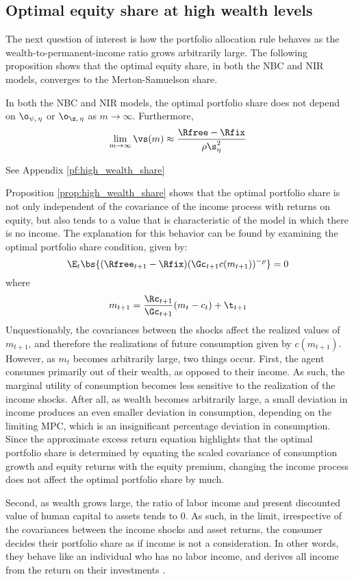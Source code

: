 \subsection{Optimal equity share at high wealth levels}

The next question of interest is how the portfolio allocation rule behaves as the wealth-to-permanent-income ratio grows arbitrarily large. The following proposition shows that the optimal equity share, in both the NBC and NIR models, converges to the Merton-Samuelson share.

\begin{prop}\label{prop:high_wealth_share}
    In both the NBC and NIR models, the optimal portfolio share does not depend on $\o_{\psi,\,\eta}$ or $\o_{\z,\,\eta}$ as $m \to \infty$. Furthermore,
    \[
        \lim_{m\to\infty}\vs(m) \approx \frac{\Rfree - \Rfix}{\rho\s_{\eta}^2}
    \]
\end{prop}

\pf See Appendix \ref{pf:high_wealth_share}

Proposition \ref{prop:high_wealth_share} shows that the optimal portfolio share is not only independent of the covariance of the income process with returns on equity, but also tends to a value that is characteristic of the model in which there is no income. The explanation for this behavior can be found by examining the optimal portfolio share condition, given by:
\[
\E_{t}\bs{(\Rfree_{t+1} - \Rfix)(\Gc_{t+1}c(m_{t+1}))^{-\rho}} = 0
\]
where
\[
m_{t+1} = \frac{\Rc_{t+1}}{\Gc_{t+1}}(m_{t} - c_{t}) + \t_{t+1}
\]
Unquestionably, the covariances between the shocks affect the realized values of $m_{t+1}$, and therefore the realizations of future consumption given by $c(m_{t+1})$. However, as $m_{t}$ becomes arbitrarily large, two things occur. First, the agent consumes primarily out of their wealth, as opposed to their income. As such, the marginal utility of consumption becomes less sensitive to the realization of the income shocks. After all, as wealth becomes arbitrarily large, a small deviation in income produces an even smaller deviation in consumption, depending on the limiting MPC, which is an insignificant percentage deviation in consumption. Since the approximate excess return equation highlights that the optimal portfolio share is determined by equating the scaled covariance of consumption growth and equity returns with the equity premium, changing the income process does not affect the optimal portfolio share by much.

Second, as wealth grows large, the ratio of labor income and present discounted value of human capital to assets tends to 0. As such, in the limit, irrespective of the covariances between the income shocks and asset returns, the consumer decides their portfolio share as if income is not a consideration. In other words, they behave like an individual who has no labor income, and derives all income from the return on their investments \citep{Carroll2024}.

